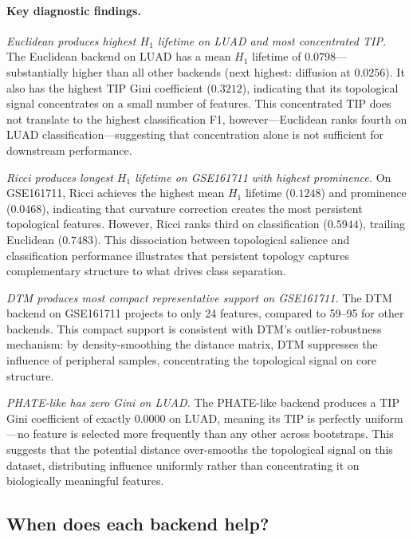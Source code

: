 \documentclass[11pt]{article}
\begin{document}
\paragraph{Key diagnostic findings.}

\textit{Euclidean produces highest $H_1$ lifetime on LUAD and most concentrated TIP.}
The Euclidean backend on LUAD has a mean $H_1$ lifetime of $0.0798$---substantially higher than all other backends (next highest: diffusion at $0.0256$).
It also has the highest TIP Gini coefficient ($0.3212$), indicating that its topological signal concentrates on a small number of features.
This concentrated TIP does not translate to the highest classification F1, however---Euclidean ranks fourth on LUAD classification---suggesting that concentration alone is not sufficient for downstream performance.

\textit{Ricci produces longest $H_1$ lifetime on GSE161711 with highest prominence.}
On GSE161711, Ricci achieves the highest mean $H_1$ lifetime ($0.1248$) and prominence ($0.0468$), indicating that curvature correction creates the most persistent topological features.
However, Ricci ranks third on classification ($0.5944$), trailing Euclidean ($0.7483$).
This dissociation between topological salience and classification performance illustrates that persistent topology captures complementary structure to what drives class separation.

\textit{DTM produces most compact representative support on GSE161711.}
The DTM backend on GSE161711 projects to only 24 features, compared to 59--95 for other backends.
This compact support is consistent with DTM's outlier-robustness mechanism: by density-smoothing the distance matrix, DTM suppresses the influence of peripheral samples, concentrating the topological signal on core structure.

\textit{PHATE-like has zero Gini on LUAD.}
The PHATE-like backend produces a TIP Gini coefficient of exactly $0.0000$ on LUAD, meaning its TIP is perfectly uniform---no feature is selected more frequently than any other across bootstraps.
This suggests that the potential distance over-smooths the topological signal on this dataset, distributing influence uniformly rather than concentrating it on biologically meaningful features.

\subsection{When does each backend help?}
\end{document}
